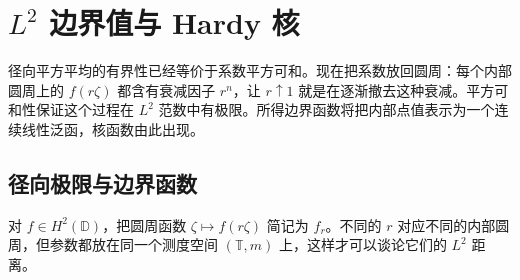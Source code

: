 \section{\texorpdfstring{\(L^2\)}{L²} 边界值与 Hardy 核}
\label{b3:sec:2802}
径向平方平均的有界性已经等价于系数平方可和。现在把系数放回圆周：每个内部圆周上的 \(f(r\zeta)\) 都含有衰减因子 \(r^n\)，让 \(r\uparrow1\) 就是在逐渐撤去这种衰减。平方可和性保证这个过程在 \(L^2\) 范数中有极限。所得边界函数将把内部点值表示为一个连续线性泛函，核函数由此出现。

\subsection{径向极限与边界函数}
\label{b3:subsec:280201}

对 \(f\in H^2(\mathbb D)\)，把圆周函数 \(\zeta\mapsto f(r\zeta)\) 简记为 \(f_r\)。不同的 \(r\) 对应不同的内部圆周，但参数都放在同一个测度空间 \((\mathbb T,m)\) 上，这样才可以谈论它们的 \(L^2\) 距离。

